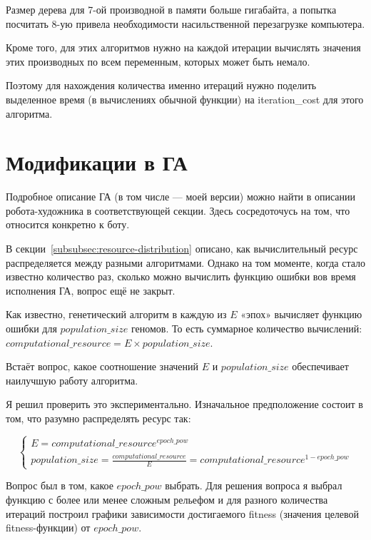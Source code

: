 \documentclass[11pt]{article}
\begin{document}
    Размер дерева для 7-ой производной в памяти больше гигабайта, а попытка посчитать 8-ую привела необходимости насильственной перезагрузке компьютера.

    Кроме того, для этих алгоритмов нужно на каждой итерации вычислять значения этих производных по всем переменным, которых может быть немало.

    Поэтому для нахождения количества именно итераций нужно поделить выделенное время (в вычислениях обычной функции) на
    iteration\_cost для этого алгоритма.


    \section{Модификации в ГА}\label{sec:ga-modifications}
    Подробное описание ГА (в том числе — моей версии) можно найти в описании робота-художника в соответствующей секции.
    Здесь сосредоточусь на том, что относится конкретно к боту.

    В секции~\ref{subsubsec:resource-distribution} описано, как вычислительный ресурс распределяется между разными алгоритмами.
    Однако на том моменте, когда стало известно количество раз, сколько можно вычислить функцию ошибки вов время исполнения ГА,
    вопрос ещё не закрыт.

    Как известно, генетический алгоритм в каждую из $E$ «эпох» вычисляет функцию ошибки для $population\_size$ геномов.
    То есть суммарное количество вычислений: $computational\_resource = E \times population\_size$.

    Встаёт вопрос, какое соотношение значений $E$ и $population\_size$ обеспечивает наилучшую работу алгоритма.

    Я решил проверить это экспериментально.
    Изначальное предположение состоит в том, что разумно распределять ресурс так:

    \begin{equation}
        \begin{cases}
            E = computational\_resource^{epoch\_pow} \\
            population\_size = \frac{computational\_resource}{E} = computational\_resource^{1 - epoch\_pow}
        \end{cases}
    \end{equation}

    Вопрос был в том, какое $epoch\_pow$ выбрать.
    Для решения вопроса я выбрал функцию с более или менее сложным рельефом и для разного количества итераций
    построил графики зависимости достигаемого fitness (значения целевой fitness-функции) от $epoch\_pow$.
\end{document}
